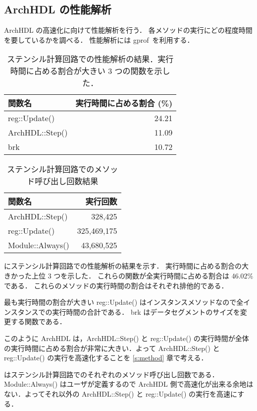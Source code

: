 


\subsection{ArchHDL の性能解析 \label{ss:profiling}}

ArchHDL の高速化に向けて性能解析を行う．
各メソッドの実行にどの程度時間を要しているかを調べる．
性能解析には gprof~\cite{gprof}を利用する．

\begin{table}[t]
 \caption{ステンシル計算回路での性能解析の結果．実行時間に占める割合が大きい 3 つの関数を示した．}
 \label{table:stencil_prof}
 \begin{center}
  \begin{tabular}{l|r} \hline
  関数名 & 実行時間に占める割合 (\%) \\ \hline
  reg::Update() & 24.21 \\
  ArchHDL::Step() & 11.09 \\
  brk & 10.72 \\ \hline
  \end{tabular}
 \end{center}
\end{table}

\begin{table}[t]
 \caption{ステンシル計算回路でのメソッド呼び出し回数結果}
 \label{table:stencil_method_call_count}
 \begin{center}
  \begin{tabular}{l|r} \hline
  関数名 & 実行回数 \\ \hline
  ArchHDL::Step()   &     328,425 \\
  reg::Update()     & 325,469,175 \\
  Module::Always()  &  43,680,525 \\ \hline
  \end{tabular}
 \end{center}
\end{table}

 にステンシル計算回路での性能解析の結果を示す．
実行時間に占める割合の大きかった上位 3 つを示した．
これらの関数が全実行時間に占める割合は 46.02\% である．
これらのメソッドの実行時間の割合はそれぞれ排他的である．

最も実行時間の割合が大きい reg::Update() はインスタンスメソッドなので全インスタンスでの実行時間の合計である．
brk はデータセグメントのサイズを変更する関数である．

このように ArchHDL は，ArchHDL::Step() と reg::Update()
の実行時間が全体の実行時間に占める割合が非常に大きい．よって
ArchHDL::Step() と reg::Update() の実行を高速化することを \ref{s:method}
章で考える．

はステンシル計算回路でのそれぞれのメソッド呼び出し回数である．Module::Always()
はユーザが定義するので ArchHDL
側で高速化が出来る余地はない．よってそれ以外の ArchHDL::Step() と
reg::Update() の実行を高速にする．

\fi